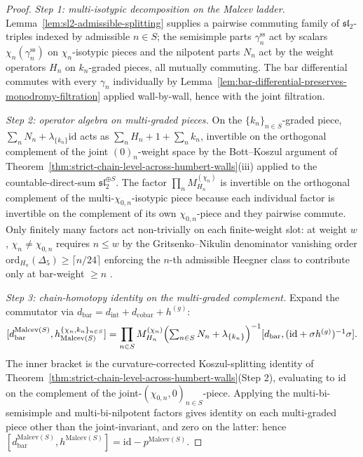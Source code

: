 \begin{proof}
\emph{Step 1: multi-isotypic decomposition on the Malcev ladder.}
Lemma~\textup{\ref{lem:sl2-admissible-splitting}} supplies a pairwise
commuting family of $\mathfrak{sl}_2$-triples indexed by admissible
$n\in S$; the semisimple parts $\gamma_n^{\mathrm{ss}}$ act by scalars
$\chi_n(\gamma_n^{\mathrm{ss}})$ on $\chi_n$-isotypic pieces and the
nilpotent parts $N_n$ act by the weight operators $H_n$ on
$k_n$-graded pieces, all mutually commuting. The bar differential
commutes with every $\gamma_n$ individually by
Lemma~\textup{\ref{lem:bar-differential-preserves-monodromy-filtration}}
applied wall-by-wall, hence with the joint filtration.

\emph{Step 2: operator algebra on multi-graded pieces.} On the
$\{k_n\}_{n\in S}$-graded piece, $\sum_n N_n+\lambda_{\{k_n\}}\mathrm{id}$
acts as $\sum_n H_n+1+\sum_n k_n$, invertible on the orthogonal
complement of the joint $(0)_n$-weight space by the Bott--Koszul
argument of
Theorem~\textup{\ref{thm:strict-chain-level-across-humbert-walls}}(iii)
applied to the countable-direct-sum $\mathfrak{sl}_2^{\oplus S}$. The
factor $\prod_n M^{(\chi_n)}_{H_n}$ is invertible on the orthogonal
complement of the multi-$\chi_{0,n}$-isotypic piece because each
individual factor is invertible on the complement of its own
$\chi_{0,n}$-piece and they pairwise commute. Only finitely many
factors act non-trivially on each finite-weight slot: at weight $w$,
$\chi_n\neq\chi_{0,n}$ requires $n\leq w$ by the Gritsenko--Nikulin
denominator vanishing order
$\mathrm{ord}_{H_n}(\Delta_5)\geq \lceil n/24\rceil$ enforcing the
$n$-th admissible Heegner class to contribute only at bar-weight
$\geq n$ \cite[\S 3, Cor.~3.2]{GritsenkoNikulin1998}.

\emph{Step 3: chain-homotopy identity on the multi-graded complement.}
Expand the commutator via
$d_{\mathrm{bar}}=d_{\mathrm{int}}+d_{\mathrm{cobar}}+h^{(g)}$:
\[
[d^{\mathrm{Malcev}(S)}_{\mathrm{bar}},
h^{\{\chi_n,k_n\}_{n\in S}}_{\mathrm{Malcev}(S)}]
=
\prod_{n\in S}M^{(\chi_n)}_{H_n}
\Bigl(\textstyle\sum_{n\in S}N_n+\lambda_{\{k_n\}}\Bigr)^{-1}
[d_{\mathrm{bar}},(\mathrm{id}+\sigma h^{(g)})^{-1}\sigma].
\]
The inner bracket is the curvature-corrected Koszul-splitting
identity of
Theorem~\textup{\ref{thm:strict-chain-level-across-humbert-walls}}(Step 2),
evaluating to $\mathrm{id}$ on the complement of the
joint-$(\chi_{0,n},0)_{n\in S}$-piece. Applying the multi-bi-semisimple
and multi-bi-nilpotent factors gives identity on each multi-graded
piece other than the joint-invariant, and zero on the latter: hence
$[d^{\mathrm{Malcev}(S)}_{\mathrm{bar}},h^{\mathrm{Malcev}(S)}]
=\mathrm{id}-p^{\mathrm{Malcev}(S)}$.


\end{proof}
